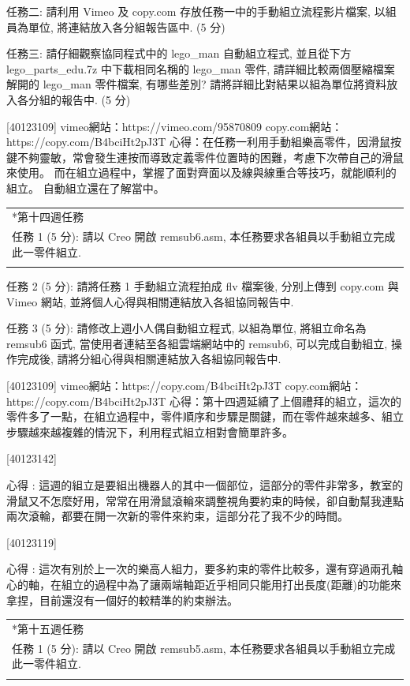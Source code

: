 \documentclass[]{article}
\begin{document}
任務二: 請利用 Vimeo 及 copy.com 存放任務一中的手動組立流程影片檔案,
以組員為單位, 將連結放入各分組報告區中. (5 分)

任務三: 請仔細觀察協同程式中的 lego\_man 自動組立程式, 並且從下方
lego\_parts\_edu.7z 中下載相同名稱的 lego\_man 零件,
請詳細比較兩個壓縮檔案解開的 lego\_man 零件檔案, 有哪些差別?
請將詳細比對結果以組為單位將資料放入各分組的報告中. (5 分)

{[}40123109{]} vimeo網站：https://vimeo.com/95870809
copy.com網站：https://copy.com/B4bciHt2pJ3T
心得：在任務一利用手動組樂高零件，因滑鼠按鍵不夠靈敏，常會發生連按而導致定義零件位置時的困難，考慮下次帶自己的滑鼠來使用。
而在組立過程中，掌握了面對齊面以及線與線重合等技巧，就能順利的組立。
自動組立還在了解當中。

\begin{longtable}[c]{@{}l@{}}
\toprule\addlinespace
*第十四週任務
\\\addlinespace
\midrule\endhead
任務 1 (5 分): 請以 Creo 開啟 remsub6.asm,
本任務要求各組員以手動組立完成此一零件組立.
\\\addlinespace
\bottomrule
\end{longtable}

任務 2 (5 分): 請將任務 1 手動組立流程拍成 flv 檔案後, 分別上傳到
copy.com 與 Vimeo 網站, 並將個人心得與相關連結放入各組協同報告中.

任務 3 (5 分): 請修改上週小人偶自動組立程式, 以組為單位, 將組立命名為
remsub6 函式, 當使用者連結至各組雲端網站中的 remsub6, 可以完成自動組立,
操作完成後, 請將分組心得與相關連結放入各組協同報告中.

{[}40123109{]} vimeo網站：https://copy.com/B4bciHt2pJ3T
copy.com網站：https://copy.com/B4bciHt2pJ3T
心得：第十四週延續了上個禮拜的組立，這次的零件多了一點，在組立過程中，零件順序和步驟是關鍵，而在零件越來越多、組立步驟越來越複雜的情況下，利用程式組立相對會簡單許多。

{[}40123142{]}

心得 :
這週的組立是要組出機器人的其中一個部位，這部分的零件非常多，教室的滑鼠又不怎麼好用，常常在用滑鼠滾輪來調整視角要約束的時候，卻自動幫我連點兩次滾輪，都要在開一次新的零件來約束，這部分花了我不少的時間。

{[}40123119{]}

心得 :
這次有別於上一次的樂高人組力，要多約束的零件比較多，還有穿過兩孔軸心的軸，在組立的過程中為了讓兩端軸距近乎相同只能用打出長度(距離)的功能來拿捏，目前還沒有一個好的較精準的約束辦法。

\begin{longtable}[c]{@{}l@{}}
\toprule\addlinespace
*第十五週任務
\\\addlinespace
\midrule\endhead
任務 1 (5 分): 請以 Creo 開啟 remsub5.asm,
本任務要求各組員以手動組立完成此一零件組立.
\\\addlinespace
\bottomrule
\end{longtable}
\end{document}
